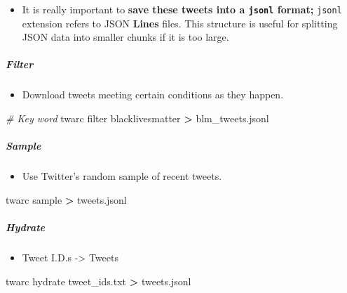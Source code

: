 \documentclass[
]{book}
\newenvironment{Shaded}{\begin{snugshade}}{\end{snugshade}}
\newcommand{\CommentTok}[1]{\textcolor[rgb]{0.56,0.35,0.01}{\textit{#1}}}
\newcommand{\ExtensionTok}[1]{#1}
\newcommand{\NormalTok}[1]{#1}
\newcommand{\OperatorTok}[1]{\textcolor[rgb]{0.81,0.36,0.00}{\textbf{#1}}}
\providecommand{\tightlist}{%
  \setlength{\itemsep}{0pt}\setlength{\parskip}{0pt}}
\begin{document}
\begin{itemize}
\tightlist
\item
  It is really important to \textbf{save these tweets into a \texttt{jsonl} format;} \texttt{jsonl} extension refers to JSON \textbf{Lines} files. This structure is useful for splitting JSON data into smaller chunks if it is too large.
\end{itemize}

\subparagraph{Filter}\label{filter}

\begin{itemize}
\tightlist
\item
  Download tweets meeting certain conditions as they happen.
\end{itemize}

\begin{Shaded}
\begin{Highlighting}[]
\CommentTok{\# Key word}
\ExtensionTok{twarc}\NormalTok{ filter blacklivesmatter }\OperatorTok{\textgreater{}}\NormalTok{ blm\_tweets.jsonl}
\end{Highlighting}
\end{Shaded}

\subparagraph{Sample}\label{sample}

\begin{itemize}
\tightlist
\item
  Use Twitter's random sample of recent tweets.
\end{itemize}

\begin{Shaded}
\begin{Highlighting}[]
\ExtensionTok{twarc}\NormalTok{ sample }\OperatorTok{\textgreater{}}\NormalTok{ tweets.jsonl }
\end{Highlighting}
\end{Shaded}

\subparagraph{Hydrate}\label{hydrate}

\begin{itemize}
\tightlist
\item
  Tweet I.D.s -\textgreater{} Tweets
\end{itemize}

\begin{Shaded}
\begin{Highlighting}[]
\ExtensionTok{twarc}\NormalTok{ hydrate tweet\_ids.txt }\OperatorTok{\textgreater{}}\NormalTok{ tweets.jsonl }
\end{Highlighting}
\end{Shaded}
\end{document}
